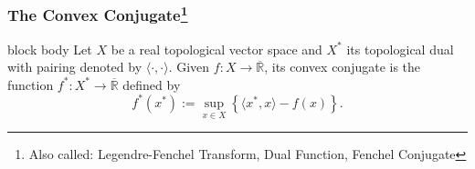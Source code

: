 \documentclass[aspectratio=169,xcolor=dvipsnames,11pt]{beamer}
\begin{document}
\begin{frame}\frametitle{The Convex Conjugate\footnote{\tiny Also called: Legendre-Fenchel Transform, Dual Function, Fenchel Conjugate}}
  \begin{minipage}{0.67\linewidth}
\begin{beamercolorbox}[rounded=true, shadow=true, wd=\textwidth]{block body}
 Let $X$ be a real topological vector space and $X^*$ its topological dual with pairing denoted by $\langle \cdot,\cdot \rangle$. 
 Given $f: X \to \overline{\mathbb R}$, its \alert{convex conjugate} is the function $f^* : X^* \to \overline{\mathbb R}$ defined by
 \[
 f^*(x^*) := \sup_{x \in X} \left\{\langle x^*,x\rangle - f(x) \right\}.
 \]
\end{beamercolorbox}
\end{minipage}\hfill
\begin{minipage}{0.3\linewidth}
 \centering
 \begin{figure}
  \centering\vspace{1ex}
\end{figure}
\end{minipage}
\end{frame}
\end{document}

